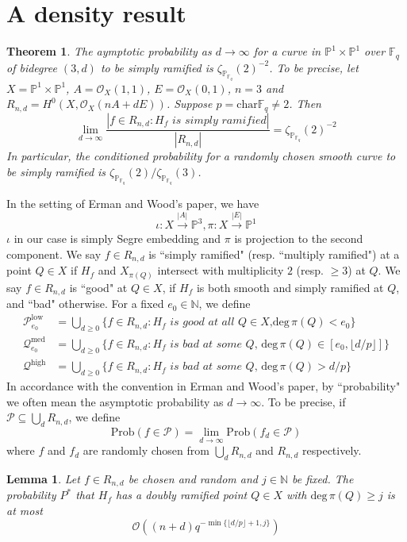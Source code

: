 \documentclass[12pt]{article}
\theoremstyle{plain}
\newtheorem{theorem}[equation]{Theorem}
\newtheorem{lemma}[equation]{Lemma}
\theoremstyle{definition}
\newcommand{\IN}{\mathbb{N}}
\newcommand{\IF}{\mathbb{F}}
\newcommand{\IP}{\mathbb{P}}
\newcommand{\sO}{\mathcal{O}}
\newcommand{\sP}{\mathcal{P}}
\newcommand{\sQ}{\mathcal{Q}}
\renewcommand{\deg}{\mathrm{deg}\,}
\newcommand\union{\bigcup}
\newcommand{\<}{\langle}
\renewcommand{\>}{\rangle}
\newcommand{\Prob}{\mathrm{Prob}}
\begin{document}
\section{A density result}
\begin{theorem}
The aymptotic probability as $d \to \infty$ for a curve in $\IP^1 \times \IP^1$ over $\IF_q$ of bidegree $(3, d)$ to be simply ramified is $\zeta_{\IP_{\IF_q}}(2)^{-2}$. To be precise, let $X = \IP^1 \times \IP^1$, $A = \sO_X(1, 1)$, $E = \sO_X(0, 1)$, $n = 3$ and $R_{n,d} = H^0(X, \sO_X(nA + d E))$. Suppose $p = \mathrm{char } \IF_q \neq 2$. Then 
$$\lim_{d \to \infty} \frac{|f \in R_{n, d} : H_f \textit{ is simply ramified}|}{|R_{n,d}|} = \zeta_{\IP_{\IF_q}}(2)^{-2} $$ In particular, the conditioned probability for a randomly chosen smooth curve to be simply ramified is $\zeta_{\IP_{\IF_q}}(2)/\zeta_{\IP_{\IF_q}}(3)$. 
\end{theorem}
In the setting of Erman and Wood's paper, we have $$\iota : X \stackrel{|A|}{\to} \IP^3, \pi : X \stackrel{|E|}{\to} \IP^1$$ $\iota$ in our case is simply Segre embedding and $\pi$ is projection to the second component. We say $f \in R_{n, d}$ is ``simply ramified" (resp. ``multiply ramified") at a point $Q \in X$ if $H_f$ and $X_{\pi(Q)}$ intersect with multiplicity $2$ (resp. $\ge 3$) at $Q$. We say $f \in R_{n, d}$ is ``good" at $Q \in X$, if $H_f$ is both smooth and simply ramified at $Q$, and ``bad" otherwise. For a fixed $e_0 \in \IN$, we define 
\begin{align*}
\sP_{e_0}^{\mathrm{low}} &= \union_{d \ge 0} \{ f \in R_{n, d} : H_f \textit{ is good at all $Q \in X$,}\deg \pi(Q) < e_0\}\\
\sQ_{e_0}^{\mathrm{med}} &= \union_{d \ge 0} \{f \in R_{n, d} : H_f \textit{ is bad at some $Q$, }\deg \pi(Q) \in [e_0, \lfloor d/p \rfloor]\}\\
\sQ^{\mathrm{high}} &= \union_{d \ge 0} \{f \in R_{n, d} : H_f \textit{ is bad at some $Q$, }\deg \pi(Q) > d/p\}
\end{align*}
In accordance with the convention in Erman and Wood's paper, by ``probability" we often mean the asymptotic probability as $d \to \infty$. To be precise, if $\sP \subseteq \union_d R_{n, d}$, we define 
$$ \Prob(f \in \sP) = \lim_{d \to \infty}\Prob(f_d \in \sP) $$
where $f$ and $f_d$ are randomly chosen from $\union_{d} R_{n, d}$ and $R_{n, d}$ respectively. 
\begin{lemma}
Let $f \in R_{n, d}$ be chosen and random and $j \in \IN$ be fixed. The probability $P^*$ that $H_f$ has a doubly ramified point $Q \in X$ with $\deg \pi(Q) \ge j$ is at most
$$ \sO((n + d)q^{- \min\{ \lfloor d/p \rfloor + 1, j    \}})$$
\end{lemma}
\end{document}
